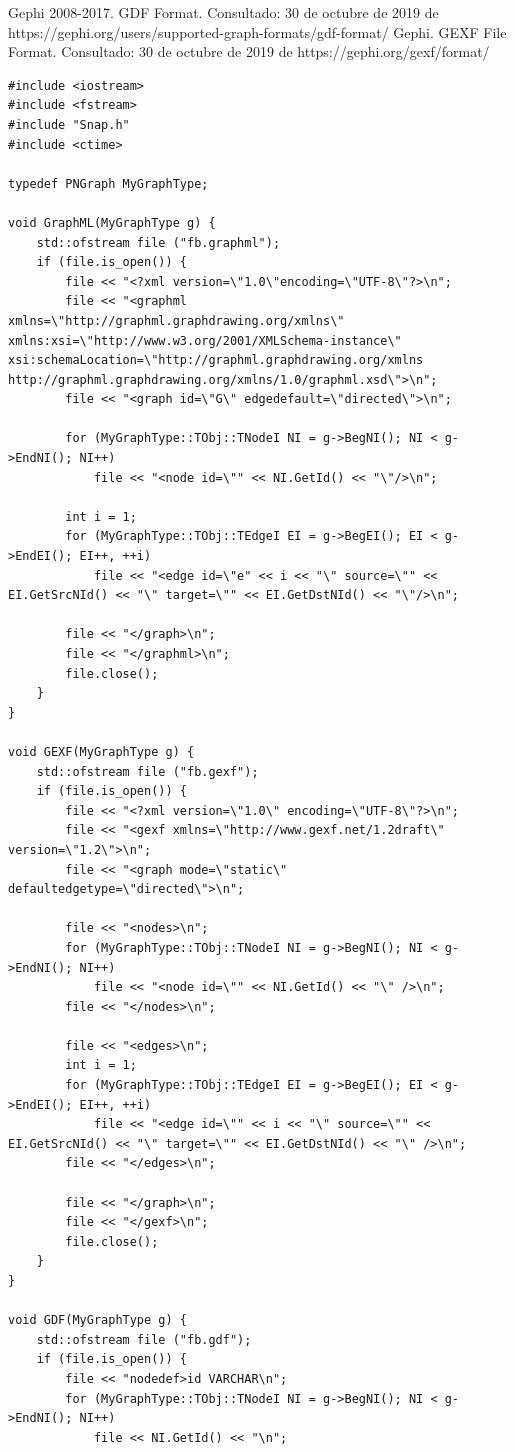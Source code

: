 \documentclass{article}
\begin{document}


 Gephi 2008-2017. GDF Format. Consultado: 30 de octubre de 2019 de https://gephi.org/users/supported-graph-formats/gdf-format/
 Gephi. GEXF File Format. Consultado: 30 de octubre de 2019 de https://gephi.org/gexf/format/

\begin{lstlisting}
#include <iostream>
#include <fstream>
#include "Snap.h"
#include <ctime>

typedef PNGraph MyGraphType;

void GraphML(MyGraphType g) {
    std::ofstream file ("fb.graphml");
	if (file.is_open()) {
		file << "<?xml version=\"1.0\"encoding=\"UTF-8\"?>\n";
		file << "<graphml xmlns=\"http://graphml.graphdrawing.org/xmlns\" xmlns:xsi=\"http://www.w3.org/2001/XMLSchema-instance\" xsi:schemaLocation=\"http://graphml.graphdrawing.org/xmlns http://graphml.graphdrawing.org/xmlns/1.0/graphml.xsd\">\n";
		file << "<graph id=\"G\" edgedefault=\"directed\">\n";

		for (MyGraphType::TObj::TNodeI NI = g->BegNI(); NI < g->EndNI(); NI++)
			file << "<node id=\"" << NI.GetId() << "\"/>\n";

		int i = 1;
		for (MyGraphType::TObj::TEdgeI EI = g->BegEI(); EI < g->EndEI(); EI++, ++i)
			file << "<edge id=\"e" << i << "\" source=\"" << EI.GetSrcNId() << "\" target=\"" << EI.GetDstNId() << "\"/>\n";

		file << "</graph>\n";
		file << "</graphml>\n";
		file.close();
	}
}

void GEXF(MyGraphType g) {
	std::ofstream file ("fb.gexf");
	if (file.is_open()) {
		file << "<?xml version=\"1.0\" encoding=\"UTF-8\"?>\n";
		file << "<gexf xmlns=\"http://www.gexf.net/1.2draft\" version=\"1.2\">\n";
		file << "<graph mode=\"static\" defaultedgetype=\"directed\">\n";
		
		file << "<nodes>\n";
		for (MyGraphType::TObj::TNodeI NI = g->BegNI(); NI < g->EndNI(); NI++)
			file << "<node id=\"" << NI.GetId() << "\" />\n";
		file << "</nodes>\n";

		file << "<edges>\n";
		int i = 1;
		for (MyGraphType::TObj::TEdgeI EI = g->BegEI(); EI < g->EndEI(); EI++, ++i)
			file << "<edge id=\"" << i << "\" source=\"" << EI.GetSrcNId() << "\" target=\"" << EI.GetDstNId() << "\" />\n";
		file << "</edges>\n";

		file << "</graph>\n";
		file << "</gexf>\n";
		file.close();
	}
}

void GDF(MyGraphType g) {
	std::ofstream file ("fb.gdf");
	if (file.is_open()) {
		file << "nodedef>id VARCHAR\n";
		for (MyGraphType::TObj::TNodeI NI = g->BegNI(); NI < g->EndNI(); NI++)
			file << NI.GetId() << "\n";


\end{lstlisting}
\end{document}
